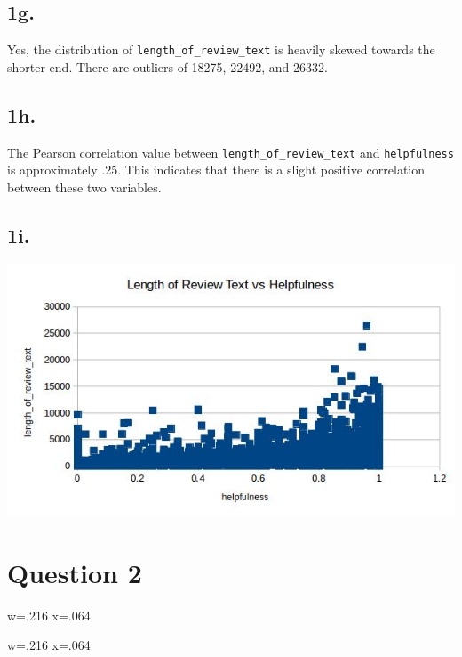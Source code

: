 \documentclass{article}
\begin{document}
\subsection{1g.}
Yes, the distribution of \texttt{length\_of\_review\_text}  is heavily skewed towards the shorter end. There are outliers of 18275, 22492, and 26332.

\subsection{1h.}
The Pearson correlation value between \texttt{length\_of\_review\_text} and \texttt{helpfulness} is approximately .25. This indicates that there is a slight positive correlation between these two variables.

\subsection{1i.}
\begin{center}
\includegraphics[keepaspectratio, scale=0.5]{scatter.jpg}
\end{center}

\section{Question 2}

w=.216
x=.064


w=.216
x=.064
\end{document}
